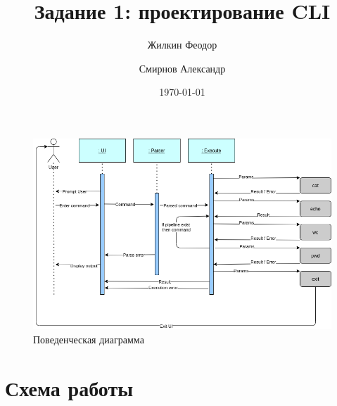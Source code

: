 \documentclass[a4paper,12pt]{article}
\title{Задание 1: проектирование CLI}
\author{
	Жилкин Феодор\\
	\and
	Смирнов Александр
}
\date{\today}
\begin{document}
\maketitle

\begin{figure}[h]
	\centering
	\includegraphics[width=\textwidth]{images/activity_diagram.png}
	\caption{Поведенческая диаграмма}
	\centering
\end{figure}


\newpage

\section*{Схема работы}
\end{document}
